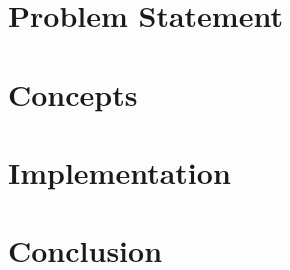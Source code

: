 \documentclass[a4paper,12pt,
headsepline,           %
oneside,               %
pointlessnumbers,      %
bibtotoc,              %
DIV=15,               %
BCOR15mm               %
]{scrartcl}
\newcommand{\fullname}{Paul Nykiel}
\newcommand{\matnr}{941496}
\begin{document}
\newpage


\tableofcontents

\newpage

\section{Problem Statement}


\section{Concepts}


\section{Implementation}


\section{Conclusion}


\newpage
\appendix

\nocite{Knappen2009}
\nocite{Mittelbach2005}
\nocite{Schlosser2014}
\nocite{Sturm2012}
\nocite{Voss2010}

\printbibliography






\end{document}
